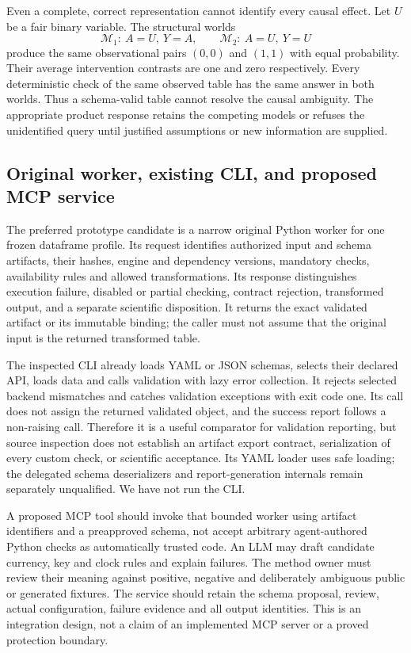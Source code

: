 Even a complete, correct representation cannot identify every causal effect.
Let $U$ be a fair binary variable. The structural worlds
\begin{equation}
 \mathcal M_1:\ A=U,\ Y=A,
 \qquad
 \mathcal M_2:\ A=U,\ Y=U
\end{equation}
produce the same observational pairs $(0,0)$ and $(1,1)$ with equal probability.
Their average intervention contrasts are one and zero respectively. Every
deterministic check of the same observed table has the same answer in both
worlds. Thus a schema-valid table cannot resolve the causal ambiguity.
The appropriate product response retains the competing models or refuses the
unidentified query until justified assumptions or new information are supplied.
\citep{exec24_pandera_reference}

\subsection{Original worker, existing CLI, and proposed MCP service}
The preferred prototype candidate is a narrow original Python worker for one
frozen dataframe profile. Its request identifies authorized input and schema
artifacts, their hashes, engine and dependency versions, mandatory checks,
availability rules and allowed transformations. Its response distinguishes
execution failure, disabled or partial checking, contract rejection, transformed
output, and a separate scientific disposition. It returns the exact validated
artifact or its immutable binding; the caller must not assume that the original
input is the returned transformed table.

The inspected CLI already loads YAML or JSON schemas, selects their declared
API, loads data and calls validation with lazy error collection. It rejects
selected backend mismatches and catches validation exceptions with exit code
one. Its call does not assign the returned validated object, and the success
report follows a non-raising call. Therefore it is a useful comparator for
validation reporting, but source inspection does not establish an artifact
export contract, serialization of every custom check, or scientific acceptance.
Its YAML loader uses safe loading; the delegated schema deserializers and
report-generation internals remain separately unqualified. We have not run
the CLI.~\citep{exec24_pandera_source}

A proposed MCP tool should invoke that bounded worker using artifact identifiers
and a preapproved schema, not accept arbitrary agent-authored Python checks as
automatically trusted code. An LLM may draft candidate currency, key and clock
rules and explain failures. The method owner must review their meaning against
positive, negative and deliberately ambiguous public or generated fixtures.
The service should retain the schema proposal, review, actual configuration,
failure evidence and all output identities. This is an integration design,
not a claim of an implemented MCP server or a proved protection boundary.

